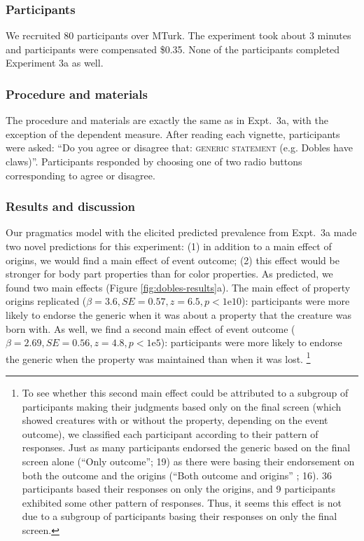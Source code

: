 \documentclass[12pt,letterpaper]{article}
\begin{document}
\subsubsection*{Participants}
We recruited 80 participants over MTurk.  
The experiment took about 3 minutes and participants were compensated \$0.35.
None of the participants completed Experiment 3a as well.

\subsubsection*{Procedure and materials}
The procedure and materials are exactly the same as in Expt.~3a, with the exception of the dependent measure.
After reading each vignette, participants were asked: ``Do you agree or disagree that: \textsc{generic statement} (e.g. Dobles have claws)''.
Participants responded by choosing one of two radio buttons corresponding to agree or disagree.

\subsubsection*{Results and discussion}


Our pragmatics model with the elicited predicted prevalence from Expt.~3a made two novel predictions for this experiment: (1) in addition to a main effect of origins, we would find a main effect of event outcome; (2) this effect would be stronger for body part properties than for color properties.
As predicted, we found two main effects (Figure \ref{fig:dobles-results}a).
The main effect of property origins replicated ($\beta=3.6, SE=0.57, z=6.5, p<1\text{e}10$): participants were more likely to endorse the generic when it was about a property that the creature was born with.
As well, we find a second main effect of event outcome 
 ($\beta = 2.69, SE = 0.56, z=4.8, p<1\text{e}5$): participants were more likely to endorse the generic when the property was maintained than when it was lost.
\footnote{
To see whether this second main effect could be attributed to a subgroup of participants making their judgments based only on the final screen (which showed creatures with or without the property, depending on  the event outcome), we classified each participant according to their pattern of responses. 
Just as many participants endorsed the generic based on the final screen alone (``Only outcome''; 19) as there were basing their endorsement on both the outcome and the origins (``Both outcome and origins'' ; 16).
36 participants based their responses on only the origins, and 9 participants exhibited some other pattern of responses.
Thus, it seems this effect is not due to a subgroup of participants basing their responses on only the final screen.
}
\end{document}
